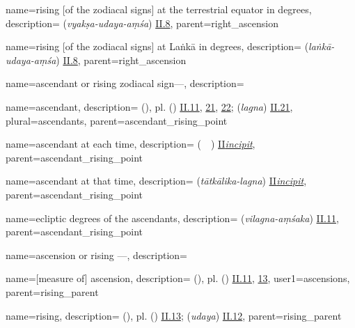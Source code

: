 {
        name={rising [of the zodiacal signs] at the terrestrial equator in degrees},
        description={ (\textit{vyakṣa-udaya-aṃśa}) \hyperlink{Sii8}{II.8}},
        parent={right_ascension}
}

{
        name={rising [of the zodiacal signs] at Laṅkā in degrees},
        description={ (\textit{laṅkā-udaya-aṃśa}) \hyperlink{Sii8}{II.8}},
        parent={right_ascension}
}

{
        name={ascendant or rising zodiacal sign---},
        description={\phantom{x}\nopagebreak}
}

{
        name={ascendant},
        description={ (\tali), pl.\thinspace {} (\tawali) \hyperlink{Pii11}{II.11}, \hyperlink{Pii21}{21}, \hyperlink{Pii22}{22};  (\textit{lagna}) \hyperlink{Sii21}{II.21}},
        plural={ascendants},
        parent={ascendant_rising_point}
}

{
        name={ascendant at each time},
        description={ (\tali\ \har\ \vaqt) \hyperlink{PiiInc}{II\thinspace\textit{incipit}}},
        parent={ascendant_rising_point}
}

{
        name={ascendant at that time},
        description={ (\textit{tātkālika-lagna}) \hyperlink{SiiInc}{II\thinspace\textit{incipit}}},
        parent={ascendant_rising_point}
}

{
        name={ecliptic degrees of the ascendants},
        description={ (\textit{vilagna-aṃśaka}) \hyperlink{Sii11}{II.11}},
        parent={ascendant_rising_point}
}


{
        name={ascension or rising ---},
        description={\phantom{x}\nopagebreak}
}

{
        name={[measure of] ascension},
        description={ (\matla), pl.\thinspace {} (\matali) \hyperlink{Pii11}{II.11}, \hyperlink{Pii13}{13}},
        user1={ascensions},
        parent={rising_parent}
}

{
        name={rising},
        description={ (\tali), pl.\thinspace {} (\tawali) \hyperlink{Pii13}{II.13};  (\textit{udaya}) \hyperlink{Sii12}{II.12}},
        parent={rising_parent}
}

